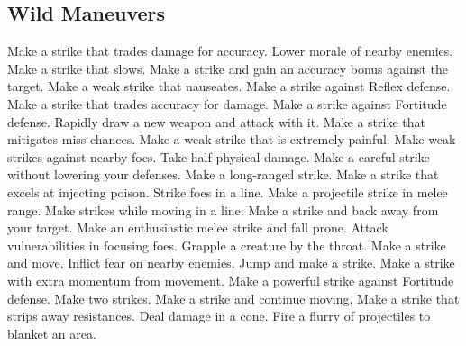 \small
\subsection{Wild Maneuvers}\label{Wild Maneuvers}
\begin{spelllist}
 Make a strike that trades damage for accuracy.
 Lower morale of nearby enemies.
 Make a strike that slows.
 Make a strike and gain an accuracy bonus against the target.
 Make a weak strike that nauseates.
 Make a strike against Reflex defense.
 Make a strike that trades accuracy for damage.
 Make a strike against Fortitude defense.
 Rapidly draw a new weapon and attack with it.
 Make a strike that mitigates miss chances.
 Make a weak strike that is extremely painful.
 Make weak strikes against nearby foes.
 Take half physical damage.
 Make a careful strike without lowering your defenses.
 Make a long-ranged strike.
 Make a strike that excels at injecting poison.
 Strike foes in a line.
 Make a projectile strike in melee range.
 Make strikes while moving in a line.
 Make a strike and back away from your target.
 Make an enthusiastic melee strike and fall prone.
 Attack vulnerabilities in focusing foes.
 Grapple a creature by the throat.
 Make a strike and move.
 Inflict fear on nearby enemies.
 Jump and make a strike.
 Make a strike with extra momentum from movement.
 Make a powerful strike against Fortitude defense.
 Make two strikes.
 Make a strike and continue moving.
 Make a strike that strips away resistances.
 Deal damage in a cone.
 Fire a flurry of projectiles to blanket an area.

\end{spelllist}
